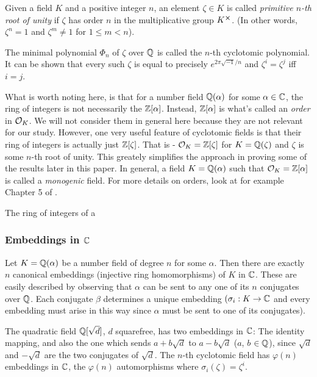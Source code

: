 \begin{definition}
    Given a field $K$ and a positive integer $n$, an element $\zeta \in K$ is called \textit{primitive $n$-th root of unity} if $\zeta$ has order $n$ in the multiplicative group $K^{\cross}$. (In other words, $\zeta^n = 1$ and $\zeta^m \neq 1$ for $1 \leq m < n$).
\end{definition}
The minimal polynomial $\Phi_n$ of $\zeta$ over $\mathbb{Q}$ is called the $n$-th cyclotomic polynomial. It can be shown that every such $\zeta$ is equal to precisely $e^{2\pi \sqrt{-1}/n}$ and $\zeta^i = \zeta^j$ iff $i = j$.

\begin{remark}
    What is worth noting here, is that for a number field $\mathbb{Q}(\alpha)$ for some $\alpha \in \mathbb{C}$, the ring of integers is not necessarily the $\mathbb{Z}[\alpha]$. Instead, $\mathbb{Z}[\alpha]$ is what's called an \textit{order} in $\mathcal{O}_K$. We will not consider them in general here because they are not relevant for our study. However, one very useful feature of cyclotomic fields is that their ring of integers is actually just $\mathbb{Z}[\zeta]$. That is - $\mathcal{O}_K = \mathbb{Z}[\zeta]$ for $K = \mathbb{Q}(\zeta)$ and $\zeta$ is some $n$-th root of unity. This greately simplifies the approach in proving some of the results later in this paper. In general, a field $K = \mathbb{Q}(\alpha)$ such that $\mathcal{O}_K = \mathbb{Z}[\alpha]$ is called a \textit{monogenic} field. For more details on orders, look at for example Chapter 5 of \cite{stein}. 
\end{remark}

\begin{proposition}
    The ring of integers of a
\end{proposition}

\subsubsection*{Embeddings in $\mathbb{C}$}
Let $K = \mathbb{Q}(\alpha)$ be a number field of degree $n$ for some $\alpha$. Then there are exactly $n$ canonical embeddings (injective ring homomorphisms) of $K$ in $\mathbb{C}$. These are easily described by observing that $\alpha$ can be sent to any one of its $n$ conjugates over $\mathbb{Q}$. Each conjugate $\beta$ determines a unique embedding $(\sigma_i: K \rightarrow \mathbb{C}$ and every embedding must arise in this way since $\alpha$ must be sent to one of its conjugates).

\begin{example}
    The quadratic field $\mathbb{Q}[\sqrt{d}]$, $d$ squarefree, has two embeddings in $\mathbb{C}$: The identity mapping, and also the one which sends $a + b\sqrt{d}$ to $a - b\sqrt{d}$ ($a$, $b$ $\in \mathbb{Q}$), since $\sqrt{d}$ and $-\sqrt{d}$ are the two conjugates of $\sqrt{d}$. The $n$-th cyclotomic field has $\varphi(n)$ embeddings in $\mathbb{C}$, the $\varphi(n)$ automorphisms where $\sigma_i(\zeta) = \zeta^i$.
\end{example}

